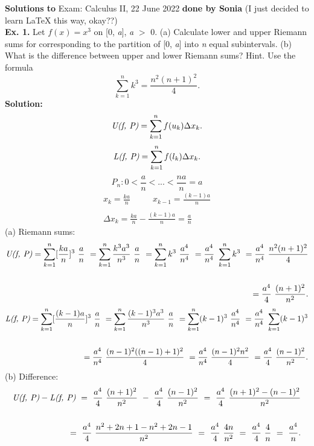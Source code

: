 \documentclass[a4paper, 12pt]{article}
\begin{document}
\textbf{Solutions to}
\bigbreak
Exam: Calculus II, 22 June 2022 
\bigbreak
\textbf{done by Sonia} (I just decided to learn LaTeX this way, okay??)\\
\bigbreak
\bigbreak
\textbf{Ex. 1.} Let \(f(x) = x^3\) on [0, \emph{a}], \emph{a} $>$ 0.
\bigbreak
(a) Calculate lower and upper Riemann sums for corresponding to the partition of [0, \emph{a}] into \emph{n} equal subintervals.
\bigbreak
(b) What is the difference between upper and lower Riemann sums?
\bigbreak
Hint. Use the formula \[ \sum_{k=1}^{n} k^3 = \frac{n^2(n+1)^2}{4}. \]
\bigbreak
\textbf{Solution:}
\[ \emph{U(f, P)} =  \sum_{k=1}^{n} f(u_k) \Delta x_k. \]
\[ \emph{L(f, P)} =  \sum_{k=1}^{n} f(l_k) \Delta x_k. \]
\[ P_n: 0 < \frac{a}{n} < ... < \frac{na}{n} = a \]
\begin{align*}
x_k = \frac{ka}{n} \,\,\,\,\,\,\,\,\,\,\,\,\,\,\,\, x_{k-1} = \frac{(k-1)a}{n}\\\\
\Delta x_k = \frac{ka}{n} - \frac{(k-1)a}{n} = \frac{a}{n}
\end{align*}
\bigbreak
(a) Riemann sums:
\begin{align*}
\emph{U(f, P)} = \sum_{k=1}^{n} [\frac{ka}{n}]^3 \,\, \frac{a}{n} \,\, 
= \sum_{k=1}^{n} \frac{k^3 a^3}{n^3} \,\, \frac{a}{n} \,\, 
= \sum_{k=1}^{n} k^3 \,\, \frac{a^4}{n^4} \,\, 
= \frac{a^4}{n^4} \,\, \sum_{k=1}^{n} k^3 \,\, 
= \frac{a^4}{n^4} \,\, \frac{n^2(n+1)^2}{4}\\\\
= \frac{a^4}{4} \,\, \frac{(n+1)^2}{n^2}.
\end{align*}
\begin{align*}
\emph{L(f, P)} = \sum_{k=1}^{n} [\frac{(k-1)a}{n}]^3 \,\, \frac{a}{n} \,\, 
= \sum_{k=1}^{n} \frac{(k-1)^3 a^3}{n^3} \,\, \frac{a}{n} \,\, 
= \sum_{k=1}^{n} (k-1)^3 \,\, \frac{a^4}{n^4} \,\, 
= \frac{a^4}{n^4} \,\, \sum_{k=1}^{n} (k-1)^3 \\\\ 
= \frac{a^4}{n^4} \,\, \frac{(n-1)^2((n-1)+1)^2}{4} \,\,
= \frac{a^4}{n^4} \,\, \frac{(n-1)^2 n^2}{4} \,\,
= \frac{a^4}{4} \,\, \frac{(n-1)^2}{n^2}.
\end{align*}
\bigbreak
\bigbreak
(b) Difference:
\begin{align*}
\emph{U(f, P)} - \emph{L(f, P)} \,\, = \,\, \frac{a^4}{4} \,\, \frac{(n+1)^2}{n^2} \,\, - \,\, \frac{a^4}{4} \,\, \frac{(n-1)^2}{n^2} \,\, = \,\, \frac{a^4}{4} \,\, \frac{(n+1)^2 - (n-1)^2}{n^2}\\\\
= \,\, \frac{a^4}{4} \,\, \frac{n^2 + 2n + 1 - n^2 + 2n - 1}{n^2}
\,\, = \,\, \frac{a^4}{4} \,\, \frac{4n}{n^2}
\,\, = \,\, \frac{a^4}{4} \,\, \frac{4}{n}
\,\, = \,\, \frac{a^4}{n}.
\end{align*}
\end{document}

